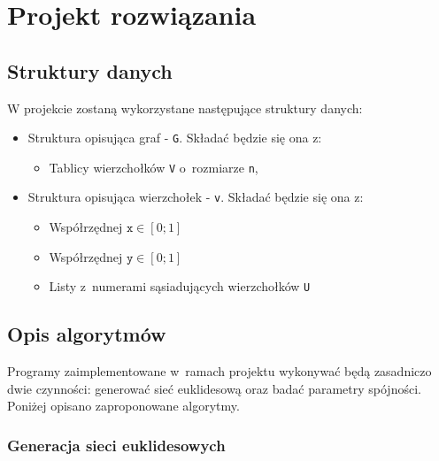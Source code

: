 
\chapter{Projekt rozwiązania}

	\section{Struktury danych}
		\label{projekt:struktury}


		\noindent W projekcie zostaną wykorzystane następujące struktury danych:
		\begin{itemize}
			\item Struktura opisująca graf - \texttt{G}. Składać będzie się ona z:
				\begin{itemize}
					\item Tablicy wierzchołków \texttt{V} o~rozmiarze \texttt{n},
 				\end{itemize}

			\item Struktura opisująca wierzchołek - \texttt{v}. Składać będzie się ona z:
				\begin{itemize}
					\item Współrzędnej $\texttt{x} \in [0; 1]$
					\item Współrzędnej $\texttt{y} \in [0; 1]$
					\item Listy z~numerami sąsiadujących wierzchołków \texttt{U}
				\end{itemize}
		\end{itemize}

	\section{Opis algorytmów}

		Programy zaimplementowane w~ramach projektu wykonywać będą zasadniczo dwie czynności: generować sieć euklidesową oraz badać parametry spójności. Poniżej opisano zaproponowane algorytmy.

		\subsection{Generacja sieci euklidesowych}
			\label{projekt:algorytmy:generacja}


